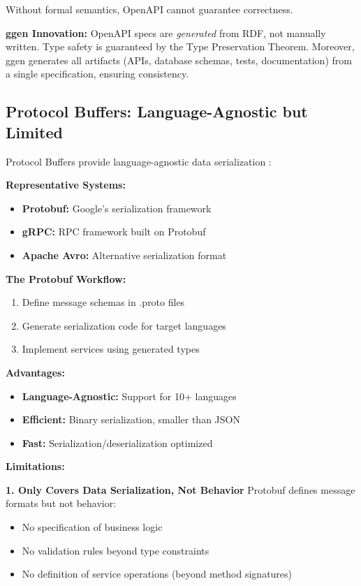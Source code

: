 Without formal semantics, OpenAPI cannot guarantee correctness.

\textbf{ggen Innovation:} OpenAPI specs are \textit{generated} from RDF, not manually written. Type safety is guaranteed by the Type Preservation Theorem. Moreover, ggen generates all artifacts (APIs, database schemas, tests, documentation) from a single specification, ensuring consistency.

\subsection{Protocol Buffers: Language-Agnostic but Limited}

Protocol Buffers provide language-agnostic data serialization \cite{protobuf}:

\textbf{Representative Systems:}
\begin{itemize}
    \item \textbf{Protobuf:} Google's serialization framework
    \item \textbf{gRPC:} RPC framework built on Protobuf
    \item \textbf{Apache Avro:} Alternative serialization format
\end{itemize}

\textbf{The Protobuf Workflow:}
\begin{enumerate}
    \item Define message schemas in .proto files
    \item Generate serialization code for target languages
    \item Implement services using generated types
\end{enumerate}

\textbf{Advantages:}
\begin{itemize}
    \item \textbf{Language-Agnostic:} Support for 10+ languages
    \item \textbf{Efficient:} Binary serialization, smaller than JSON
    \item \textbf{Fast:} Serialization/deserialization optimized
\end{itemize}

\textbf{Limitations:}

\textbf{1. Only Covers Data Serialization, Not Behavior}
Protobuf defines message formats but not behavior:
\begin{itemize}
    \item No specification of business logic
    \item No validation rules beyond type constraints
    \item No definition of service operations (beyond method signatures)
\end{itemize}

